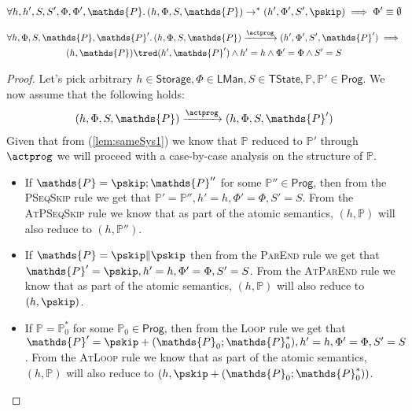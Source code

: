 \lem \label{ref:phiemp}
\[
\forall h, h', S, S', \Phi, \Phi', \mathds{P} \ldotp
(h, \Phi, S, \mathds{P}) \rightarrow^* (h', \Phi', S', \pskip) \implies \Phi' \equiv \emptyset
\]
\fi

\lem \label{lem:sameSys}
\begin{gather*}
	\forall h, \Phi, S, \mathds{P}, \mathds{P}' \ldotp
	(h, \Phi, S, \mathds{P}) \xrightarrow{\actprog} (h', \Phi', S', \mathds{P}')
		\implies \\
	(h, \mathds{P}) \tred (h', \mathds{P}') \land h' = h \land \Phi' = \Phi \land S' = S
\end{gather*}
\begin{proof}
Let's pick arbitrary $h \in \mathsf{Storage}, \Phi \in \mathsf{LMan}, S \in \mathsf{TState}, \mathds{P}, \mathds{P}' \in \mathsf{Prog}$. We now assume that the following holds:
\begin{gather}
	\label{lem:sameSys1} (h, \Phi, S, \mathds{P}) \xrightarrow{\actprog} (h, \Phi, S, \mathds{P}')
\end{gather}
Given that from (\ref{lem:sameSys1}) we know that $\mathds{P}$ reduced to $\mathds{P'}$ through $\actprog$ we will proceed with a case-by-case analysis on the structure of $\mathds{P}$.
\begin{itemize}
	\item If $\mathds{P} = \pskip ; \mathds{P}''$ for some $\mathds{P}'' \in \mathsf{Prog}$, then from the \textsc{PSeqSkip} rule we get that $\mathds{P}' = \mathds{P}'', h' = h, \Phi' = \Phi, S' = S$. From the \textsc{AtPSeqSkip} rule we know that as part of the atomic semantics, $(h, \mathds{P})$ will also reduce to $(h, \mathds{P}'')$.
	
	\item If $\mathds{P} = \pskip \| \pskip$ then from the \textsc{ParEnd} rule we get that $\mathds{P}' = \pskip, h' = h, \Phi' = \Phi, S' = S$. From the \textsc{AtParEnd} rule we know that as part of the atomic semantics, $(h, \mathds{P})$ will also reduce to $(h, \pskip)$.
	
	\item If $\mathds{P} = \mathds{P}_0^*$ for some $\mathds{P}_0 \in \mathsf{Prog}$, then from the \textsc{Loop} rule we get that $\mathds{P}' = \pskip + (\mathds{P}_0;\mathds{P}_0^*), h' = h, \Phi' = \Phi, S' = S$. From the \textsc{AtLoop} rule we know that as part of the atomic semantics, $(h, \mathds{P})$ will also reduce to $(h, \pskip + (\mathds{P}_0;\mathds{P}_0^*))$.
	

\end{itemize}
\end{proof}
